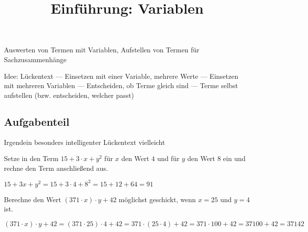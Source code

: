 \documentclass[solution]{uebungsblatt}
\title{Einführung: Variablen}
\begin{document}
\maketitle
\begin{contents}
    Auswerten von Termen mit Variablen, Aufstellen von Termen für Sachzusammenhänge
\end{contents}


Idee: Lückentext --- Einsetzen mit einer Variable, mehrere Werte --- Einsetzen mit mehreren Variablen --- Entscheiden, ob Terme gleich sind --- Terme selbst aufstellen (bzw. entscheiden, welcher passt)

\subsection*{Aufgabenteil}
\begin{exercise}
    Irgendein besonders intelligenter Lückentext vielleicht
\end{exercise}
\begin{exercise}
    Setze in den Term $15+3\cdot x+y^2$ für $x$ den Wert $4$ und für $y$ den Wert $8$ ein und rechne den Term anschließend aus.
    \begin{answerbox}[0.4in]
        $15+3x+y^2=15+3\cdot 4+8^2=15+12+64=91$
    \end{answerbox}
\end{exercise}
\begin{exercise}
    Berechne den Wert $(371\cdot x)\cdot y+42$ möglichst geschickt, wenn $x=25$ und $y=4$ ist.
    \begin{answerbox}[0.4in]
        $(371\cdot x)\cdot y+42=(371\cdot 25)\cdot 4+42=371\cdot (25\cdot 4)+42=371\cdot 100+42=37100+42=37142$
    \end{answerbox}
\end{exercise}
\end{document}
